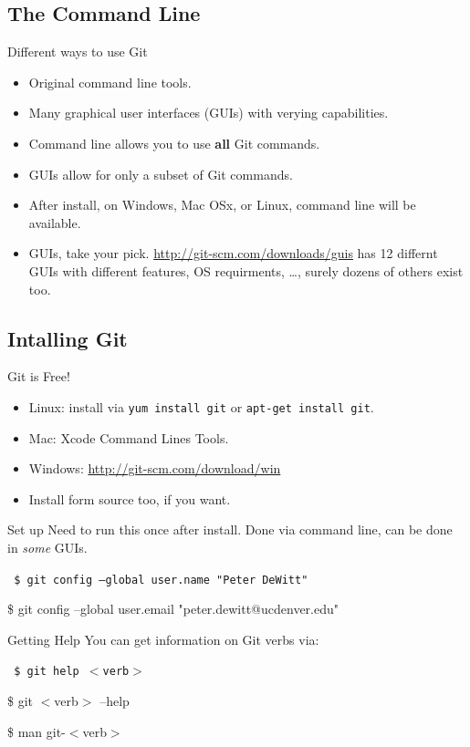 \subsection{The Command Line}
\begin{frame}[t]{Different ways to use Git}
  \begin{itemize}
    \item Original command line tools.
    \item Many graphical user interfaces (GUIs) with verying capabilities.

    \item Command line allows you to use {\bf all} Git commands.
    \item GUIs allow for only a subset of Git commands.

    \item After install, on Windows, Mac OSx, or Linux, command line will be
      available.
    \item GUIs, take your pick. \url{http://git-scm.com/downloads/guis} has 12
      differnt GUIs with different features, OS requirments, \ldots, surely
      dozens of others exist too.
  \end{itemize}
\end{frame}

\subsection{Intalling Git}
\begin{frame}[t]{Git is Free!}
  \begin{itemize}
    \item Linux: install via {\tt yum install git} or {\tt apt-get install git}.
    \item Mac: Xcode Command Lines Tools.
    \item Windows: \url{http://git-scm.com/download/win}
    \item Install form source too, if you want.
  \end{itemize}
\end{frame}

\begin{frame}[t]{Set up}
  Need to run this once after install.  Done via command line, can be done in
  {\it some} GUIs.

  {\tt
    \$ git config --global user.name "Peter DeWitt"

    \$ git config --global user.email "peter.dewitt@ucdenver.edu" 
  } 
\end{frame}

\begin{frame}[t]{Getting Help}
  You can get information on Git verbs via:

  {\tt
    \$ git help $<$verb$>$

    \$ git $<$verb$>$ --help

    \$ man git-$<$verb$>$ 
  } 
\end{frame}
